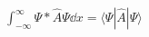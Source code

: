 

\vspace*{\fill}
\centering

\begin{align*}
    \int_{-\infty}^{\infty} \Psi* \hat{A} \Psi \dd{x} = \langle \Psi | \hat{A} | \Psi \rangle
\end{align*}

\centering
\vspace*{\fill}

